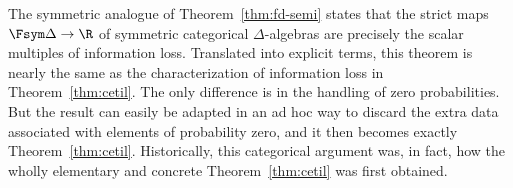 The symmetric analogue of Theorem~\ref{thm:fd-semi} states that the strict
maps $\Fsym\Delta \to \R$ of symmetric categorical $\Delta$-algebras are
precisely the scalar multiples of information loss.  Translated into
explicit terms, this theorem is nearly the same as the
characterization of information loss in Theorem~\ref{thm:cetil}.  The only
difference is in the handling of zero probabilities.
But the result can easily be adapted in an ad hoc way to discard the
extra data associated with elements of probability zero, and it then becomes
exactly Theorem~\ref{thm:cetil}.  Historically, this
categorical argument was, in fact, how the wholly elementary
and concrete Theorem~\ref{thm:cetil} was first obtained.

